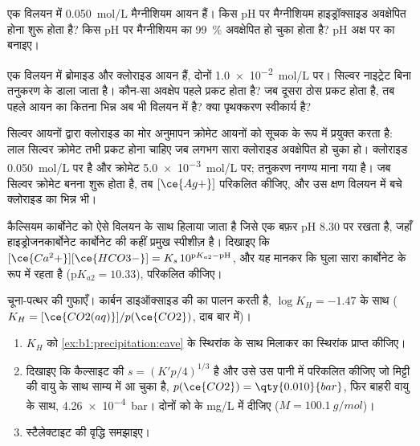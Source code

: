 \begin{exercise}[$\star\star$]\label{exo:b1:precipitation:6}
एक विलयन में \qty{0.050}{mol/L} मैग्नीशियम आयन हैं। किस pH पर
मैग्नीशियम हाइड्रॉक्साइड अवक्षेपित होना शुरू होता है? किस pH पर
मैग्नीशियम का \qty{99}{\percent} अवक्षेपित हो चुका होता है? pH अक्ष पर  का
 बनाइए।
\end{exercise}

\begin{exercise}[$\star\star$]\label{exo:b1:precipitation:7}
एक विलयन में ब्रोमाइड और क्लोराइड आयन हैं, दोनों
\qty{1.0e-2}{mol/L} पर। सिल्वर नाइट्रेट बिना तनुकरण के डाला जाता है। कौन-सा
अवक्षेप पहले प्रकट होता है? जब दूसरा ठोस प्रकट होता है, तब पहले आयन का कितना भिन्न
अब भी विलयन में है? क्या पृथक्करण स्वीकार्य है?
\end{exercise}

\begin{exercise}[$\star\star$]\label{exo:b1:precipitation:8}
सिल्वर आयनों द्वारा क्लोराइड का मोर अनुमापन क्रोमेट आयनों को
सूचक के रूप में प्रयुक्त करता है: लाल सिल्वर क्रोमेट तभी प्रकट होना चाहिए जब लगभग सारा
क्लोराइड अवक्षेपित हो चुका हो। क्लोराइड \qty{0.050}{mol/L} पर है और क्रोमेट
\qty{5.0e-3}{mol/L} पर; तनुकरण नगण्य माना गया है। जब सिल्वर क्रोमेट बनना
शुरू होता है, तब $[\ce{Ag+}]$ परिकलित कीजिए, और उस क्षण विलयन में बचे
क्लोराइड का भिन्न भी।
\end{exercise}

\begin{exercise}[$\star\star$]\label{exo:b1:precipitation:9}
कैल्सियम कार्बोनेट को ऐसे विलयन के साथ हिलाया जाता है जिसे एक बफ़र pH 8.30 पर रखता है,
जहाँ हाइड्रोजनकार्बोनेट कार्बोनेट की कहीं प्रमुख स्पीशीज़ है। दिखाइए कि
$[\ce{Ca^2+}][\ce{HCO3-}] = K_s\,10^{\mathrm{p}K_{a2} - \mathrm{pH}}$, और
यह मानकर कि घुला सारा कार्बोनेट
 के रूप में रहता है ($\mathrm{p}K_{a2} = 10.33$),  परिकलित कीजिए।
\end{exercise}

\begin{exercise}[$\star\star\star$]\label{exo:b1:precipitation:10}
चूना-पत्थर की गुफाएँ। कार्बन डाइऑक्साइड की 
 का पालन करती है, $\log K_H = -1.47$ के साथ ($K_H =
[\ce{CO2(aq)}]/p(\ce{CO2})$, दाब बार में)।
\begin{enumerate}
  \item $K_H$ को \cref{ex:b1:precipitation:cave} के स्थिरांक के साथ
        मिलाकर
         का स्थिरांक प्राप्त कीजिए।
  \item दिखाइए कि कैल्साइट की  $s = (K'p/4)^{1/3}$ है और
        उसे उस पानी में परिकलित कीजिए जो मिट्टी की वायु के साथ साम्य में आ चुका है,
        $p(\ce{CO2}) = \qty{0.010}{bar}$, फिर बाहरी वायु के साथ,
        \qty{4.26e-4}{bar}। दोनों को  के \unit{mg/L} में दीजिए
        ($M = \qty{100.1}{g/mol}$)।
  \item स्टैलेक्टाइट की वृद्धि समझाइए।
\end{enumerate}
\end{exercise}

